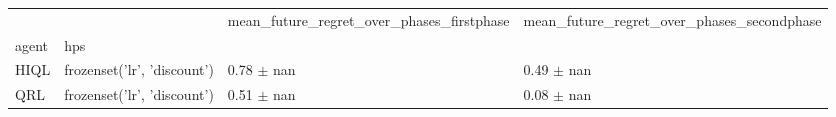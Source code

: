 \begin{tabular}{llll}
\toprule
 &  & mean_future_regret_over_phases_firstphase & mean_future_regret_over_phases_secondphase \\
agent & hps &  &  \\
\midrule
HIQL & frozenset({'lr', 'discount'}) & 0.78 $\pm$ nan & 0.49 $\pm$ nan \\
\cline{1-4}
QRL & frozenset({'lr', 'discount'}) & 0.51 $\pm$ nan & 0.08 $\pm$ nan \\
\cline{1-4}
\bottomrule
\end{tabular}
